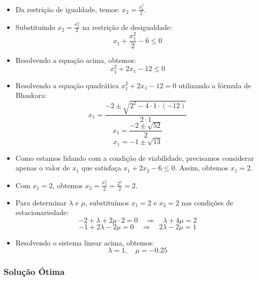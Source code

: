 \documentclass[a4paper, 12pt]{article}
\begin{document}
\begin{itemize}
    \item Da restrição de igualdade, temos: $x_2 = \frac{x_1^2}{2}$.
    \item Substituindo $x_2 = \frac{x_1^2}{2}$ na restrição de desigualdade: 
    \begin{equation*}
        x_1 + \frac{x_1^2}{2} - 6 \leq 0
    \end{equation*}
    \item Resolvendo a equação acima, obtemos:
    \begin{equation*}
        x_1^2 + 2x_1 - 12 \leq 0
    \end{equation*}
    \item Resolvendo a equação quadrática $x_1^2 + 2x_1 - 12 = 0$ utilizando a fórmula de Bhaskara:
    \begin{equation*}
        x_1 = \frac{-2 \pm \sqrt{2^2 - 4 \cdot 1 \cdot (-12)}}{2 \cdot 1}
    \end{equation*}
    \begin{equation*}
        x_1 = \frac{-2 \pm \sqrt{52}}{2}
    \end{equation*}
    \begin{equation*}
        x_1 = -1 \pm \sqrt{13}
    \end{equation*}
    \item Como estamos lidando com a condição de viabilidade, precisamos considerar apenas o valor de $x_1$ que satisfaça $x_1 + 2x_2 - 6 \leq 0$. Assim, obtemos $x_1 = 2$.
    \item Com $x_1 = 2$, obtemos $x_2 = \frac{x_1^2}{2} = \frac{2^2}{2} = 2$.
    \item Para determinar $\lambda$ e $\mu$, substituímos $x_1 = 2$ e $x_2 = 2$ nas condições de estacionariedade:
    \begin{equation*}
        -2 + \lambda + 2\mu \cdot 2 = 0 \quad \Rightarrow \quad \lambda + 4\mu = 2
    \end{equation*}
    \begin{equation*}
        -1 + 2\lambda - 2\mu = 0 \quad \Rightarrow \quad 2\lambda - 2\mu = 1
    \end{equation*}
    \item Resolvendo o sistema linear acima, obtemos:
    \begin{equation*}
        \lambda = 1, \quad \mu = -0.25
    \end{equation*}
\end{itemize}

\subsubsection{Solução Ótima}
\end{document}
